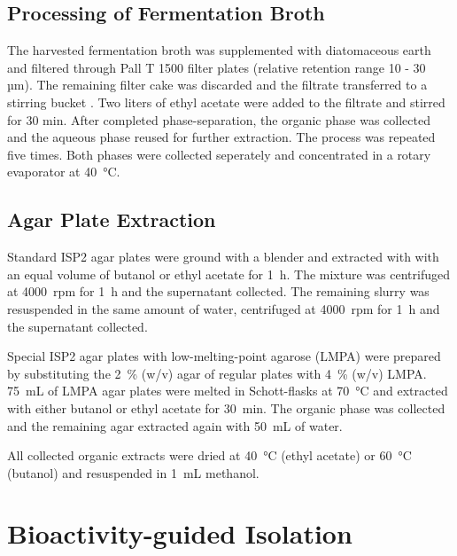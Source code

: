 	\subsection{Processing of Fermentation Broth} %
	\label{sub:processing_of_fermentation_broth}
	The harvested fermentation broth was supplemented with diatomaceous earth and filtered through Pall T 1500 filter plates (relative retention range 10 - 30 µm). The remaining filter cake was discarded and the filtrate transferred to a stirring bucket . Two liters of ethyl acetate were added to the filtrate and stirred for 30 min. After completed phase-separation, the organic phase was collected and the aqueous phase reused for further extraction. The process was repeated five times. Both phases were collected seperately and concentrated in a rotary evaporator at \SI{40}{\celsius}.

	\subsection{Agar Plate Extraction} %
	\label{sub:agar_plate_extraction}

	Standard ISP2 agar plates were ground with a blender and extracted with with an equal volume of butanol or ethyl acetate for \SI{1}{\hour}. The mixture was centrifuged at 4000~rpm for \SI{1}{\hour} and the supernatant collected. The remaining slurry was resuspended in the same amount of water, centrifuged at 4000~rpm for \SI{1}{\hour} and the supernatant collected.

	Special ISP2 agar plates with low-melting-point agarose (LMPA) were prepared by substituting the 2~\% (w/v) agar of regular plates with 4~\% (w/v) LMPA. \SI{75}{\milli\liter} of LMPA agar plates were melted in Schott-flasks at \SI{70}{\celsius} and extracted with either butanol or ethyl acetate for \SI{30}{\minute}. The organic phase was collected and the remaining agar extracted again with \SI{50}{\milli\liter} of water.

	All collected organic extracts were dried at \SI{40}{\celsius} (ethyl acetate) or \SI{60}{\celsius} (butanol) and resuspended in \SI{1}{\milli\liter} methanol.


\clearpage

\section{Bioactivity-guided Isolation} %
\label{sec:bioactivity_guided_isolation}

